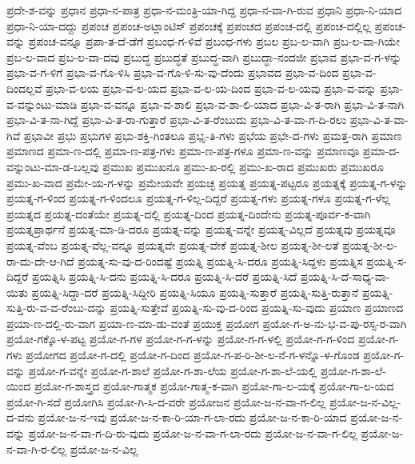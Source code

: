 {ಪ್ರದೇ-ಶ-ವನ್ನು
ಪ್ರಧಾನ
ಪ್ರಧಾ-ನ-ಪಾತ್ರ
ಪ್ರಧಾ-ನ-ಮಂತ್ರಿ-ಯಾ-ಗಿದ್ದ
ಪ್ರಧಾ-ನ-ವಾ-ಗಿ-ರುವ
ಪ್ರಧಾನಿ
ಪ್ರಧಾ-ನಿ-ಯಾದ
ಪ್ರಧಾ-ನಿ-ಯಾ-ದದ್ದು
ಪ್ರಪಂಚ
ಪ್ರಪಂಚ-ಅಟ್ಲಾಂಟಿಸ್
ಪ್ರಪಂಚಕ್ಕೆ
ಪ್ರಪಂಚದ
ಪ್ರಪಂಚ-ದಲ್ಲಿ
ಪ್ರಪಂಚ-ದಲ್ಲಿಲ್ಲ
ಪ್ರಪಂಚ-ವನ್ನು
ಪ್ರಪಂಚ-ವನ್ನೂ
ಪ್ರಪಾ-ತ-ದೆ-ಡೆಗೆ
ಪ್ರಬಂಧ-ಗ-ಳಿವೆ
ಪ್ರಬಂಧ-ಗಳು
ಪ್ರಬಲ
ಪ್ರಬ-ಲ-ವಾಗಿ
ಪ್ರಬ-ಲ-ವಾ-ಗಿಯೇ
ಪ್ರಬ-ಲ-ವಾದ
ಪ್ರಬ-ಲ-ವಾ-ದವು
ಪ್ರಬುದ್ಧ
ಪ್ರಬುದ್ಧತೆ
ಪ್ರಬುದ್ಧ-ವಾಗಿ
ಪ್ರಬುದ್ಧಾ-ನಂದಜೀ
ಪ್ರಭಾವ
ಪ್ರಭಾ-ವ-ಗ-ಳನ್ನು
ಪ್ರಭಾ-ವ-ಗ-ಳಿಗೆ
ಪ್ರಭಾ-ವ-ಗೊ-ಳಿಸಿ
ಪ್ರಭಾ-ವ-ಗೊ-ಳಿ-ಸು-ವು-ದೆಂದು
ಪ್ರಭಾವದ
ಪ್ರಭಾ-ವ-ದಿಂದ
ಪ್ರಭಾ-ವ-ದಿಂದಲ್ಲವೆ
ಪ್ರಭಾ-ವ-ಲಯ
ಪ್ರಭಾ-ವ-ಲ-ಯದ
ಪ್ರಭಾ-ವ-ಲ-ಯ-ದಿಂದ
ಪ್ರಭಾ-ವ-ಲ-ಯವು
ಪ್ರಭಾ-ವ-ವನ್ನು
ಪ್ರಭಾ-ವ-ವನ್ನುಂಟು-ಮಾಡಿ
ಪ್ರಭಾ-ವ-ವನ್ನೂ
ಪ್ರಭಾ-ವ-ಶಾಲಿ
ಪ್ರಭಾ-ವ-ಶಾ-ಲಿ-ಯಾದ
ಪ್ರಭಾ-ವಿ-ತ-ರಾಗಿ
ಪ್ರಭಾ-ವಿ-ತ-ನಾಗಿ
ಪ್ರಭಾ-ವಿ-ತ-ನಾ-ಗಿದ್ದೆ
ಪ್ರಭಾ-ವಿ-ತ-ರಾ-ಗುತ್ತಾರೆ
ಪ್ರಭಾ-ವಿ-ತ-ರೆಂಬುದು
ಪ್ರಭಾ-ವಿ-ತ-ವಾ-ಗ-ದಿ-ರಲು
ಪ್ರಭಾ-ವಿ-ತ-ವಾ-ಗಿವೆ
ಪ್ರಭಾವೀ
ಪ್ರಭು
ಪ್ರಭುಗಳ
ಪ್ರಭು-ಶಕ್ತಿ-ಗಿಂತಲೂ
ಪ್ರಭೃ-ತಿ-ಗಳು
ಪ್ರಭೆಯ
ಪ್ರಭೇ-ದ-ಗಳು
ಪ್ರಮತ್ತ-ರಾಗಿ
ಪ್ರಮಾಣ
ಪ್ರಮಾಣದ
ಪ್ರಮಾ-ಣ-ದಲ್ಲಿ
ಪ್ರಮಾ-ಣ-ಪತ್ರ-ಗಳು
ಪ್ರಮಾ-ಣ-ಪತ್ರ-ಗಳೂ
ಪ್ರಮಾ-ಣ-ವನ್ನು
ಪ್ರಮಾಣವೂ
ಪ್ರಮಾ-ದ-ವನ್ನುಂಟು-ಮಾ-ಡ-ಬಲ್ಲವು
ಪ್ರಮುಖ
ಪ್ರಮುಖನೂ
ಪ್ರಮು-ಖ-ರಲ್ಲಿ
ಪ್ರಮು-ಖ-ರಾದ
ಪ್ರಮುಖರು
ಪ್ರಮುಖರೂ
ಪ್ರಮು-ಖ-ವಾದ
ಪ್ರಮೇ-ಯ-ಗ-ಳನ್ನು
ಪ್ರಮೇಯವೇ
ಪ್ರಯಚ್ಛ
ಪ್ರಯತ್ನ
ಪ್ರಯತ್ನ-ಪಟ್ಟರೂ
ಪ್ರಯತ್ನಕ್ಕೆ
ಪ್ರಯತ್ನ-ಗ-ಳನ್ನು
ಪ್ರಯತ್ನ-ಗ-ಳಿಂದ
ಪ್ರಯತ್ನ-ಗ-ಳಿಂದಲೂ
ಪ್ರಯತ್ನ-ಗ-ಳಿಲ್ಲ-ದಿದ್ದರೆ
ಪ್ರಯತ್ನ-ಗಳು
ಪ್ರಯತ್ನ-ಗಳೂ
ಪ್ರಯತ್ನ-ಗ-ಳೆಲ್ಲ
ಪ್ರಯತ್ನದ
ಪ್ರಯತ್ನ-ದಂತೆಯೇ
ಪ್ರಯತ್ನ-ದಲ್ಲಿ
ಪ್ರಯತ್ನ-ದಿಂದ
ಪ್ರಯತ್ನ-ದಿಂದೇನು
ಪ್ರಯತ್ನ-ಪೂರ್ವ-ಕ-ವಾಗಿ
ಪ್ರಯತ್ನಪ್ರಾರ್ಥನೆ
ಪ್ರಯತ್ನ-ಮಾ-ಡಿ-ದರೂ
ಪ್ರಯತ್ನ-ವನ್ನು
ಪ್ರಯತ್ನ-ವನ್ನೇ
ಪ್ರಯತ್ನ-ವಿಲ್ಲದೆ
ಪ್ರಯತ್ನವು
ಪ್ರಯತ್ನವೂ
ಪ್ರಯತ್ನ-ವೆಂಬ
ಪ್ರಯತ್ನ-ವೆಲ್ಲ-ವನ್ನೂ
ಪ್ರಯತ್ನವೇ
ಪ್ರಯತ್ನ-ವೇಕೆ
ಪ್ರಯತ್ನ-ಶೀಲ
ಪ್ರಯತ್ನ-ಶೀ-ಲತೆ
ಪ್ರಯತ್ನ-ಶೀ-ಲ-ರಾ-ದು-ದೇ-ಆ-ಗಿದೆ
ಪ್ರಯತ್ನ-ಸು-ವು-ದ-ರಿಂದಷ್ಟೆ
ಪ್ರಯತ್ನಿ
ಪ್ರಯತ್ನಿ-ಸಿ-ದರೂ
ಪ್ರಯತ್ನಿ-ಸಿದ್ದಳು
ಪ್ರಯತ್ನಿಸ
ಪ್ರಯತ್ನಿ-ಸ-ದಿದ್ದರೆ
ಪ್ರಯತ್ನಿಸಿ
ಪ್ರಯತ್ನಿ-ಸಿ-ದನು
ಪ್ರಯತ್ನಿ-ಸಿ-ದರೂ
ಪ್ರಯತ್ನಿ-ಸಿ-ದರೆ
ಪ್ರಯತ್ನಿ-ಸಿದೆ
ಪ್ರಯತ್ನಿ-ಸಿ-ದೆ-ಸಾಧ್ಯ-ವಾ-ಯಿತು
ಪ್ರಯತ್ನಿ-ಸಿದ್ದಾ-ದರೆ
ಪ್ರಯತ್ನಿ-ಸಿದ್ದೀರಿ
ಪ್ರಯತ್ನಿ-ಸಿಯೂ
ಪ್ರಯತ್ನಿ-ಸುತ್ತಾರೆ
ಪ್ರಯತ್ನಿ-ಸುತ್ತಿ-ರುತ್ತಾನೆ
ಪ್ರಯತ್ನಿ-ಸುತ್ತಿ-ರು-ವ-ವ-ರೆಂಬು-ದನ್ನು
ಪ್ರಯತ್ನಿ-ಸುತ್ತೇವೆ
ಪ್ರಯತ್ನಿ-ಸು-ವು-ದ-ರಿಂದ
ಪ್ರಯತ್ನಿ-ಸು-ವುದು
ಪ್ರಯಾಣ
ಪ್ರಯಾಣದ
ಪ್ರಯಾ-ಣ-ದಲ್ಲಿ-ರು-ವಾಗ
ಪ್ರಯಾ-ಣ-ಮಾ-ಡು-ವಂತೆ
ಪ್ರಯುಕ್ತ
ಪ್ರಯೋಗ
ಪ್ರಯೋ-ಗ-ಅ-ನು-ಭ-ವ-ಪು-ರಸ್ಸ-ರ-ವಾಗಿ
ಪ್ರಯೋ-ಗಕ್ಕೊ-ಳ-ಪಟ್ಟ
ಪ್ರಯೋ-ಗ-ಗಳ
ಪ್ರಯೋ-ಗ-ಗ-ಳನ್ನು
ಪ್ರಯೋ-ಗ-ಗ-ಳಲ್ಲಿ
ಪ್ರಯೋ-ಗ-ಗ-ಳಿಂದ
ಪ್ರಯೋ-ಗ-ಗಳು
ಪ್ರಯೋಗದ
ಪ್ರಯೋ-ಗ-ದಲ್ಲಿ
ಪ್ರಯೋ-ಗ-ದಿಂದ
ಪ್ರಯೋ-ಗ-ಪ-ರಿ-ಶೀ-ಲ-ನೆ-ಗ-ಳನ್ನೊ-ಳ-ಗೊಂಡ
ಪ್ರಯೋ-ಗ-ವನ್ನು
ಪ್ರಯೋ-ಗ-ವನ್ನೇ
ಪ್ರಯೋ-ಗ-ಶಾಲೆ
ಪ್ರಯೋ-ಗ-ಶಾ-ಲೆಯ
ಪ್ರಯೋ-ಗ-ಶಾ-ಲೆ-ಯಲ್ಲಿ
ಪ್ರಯೋ-ಗ-ಶಾ-ಲೆ-ಯಿಂದ
ಪ್ರಯೋ-ಗ-ಶಾಸ್ತ್ರದ
ಪ್ರಯೋ-ಗಾತ್ಮಕ
ಪ್ರಯೋ-ಗಾತ್ಮ-ಕ-ವಾಗಿ
ಪ್ರಯೋ-ಗಾ-ಲ-ಯಕ್ಕೆ
ಪ್ರಯೋ-ಗಾ-ಲ-ಯದ
ಪ್ರಯೋ-ಗಿ-ಸದೆ
ಪ್ರಯೋಗಿಸಿ
ಪ್ರಯೋ-ಗಿ-ಸಿ-ದ-ವರೇ
ಪ್ರಯೋಜನ
ಪ್ರಯೋ-ಜ-ನ-ವಾ-ಗ-ಲಿಲ್ಲ
ಪ್ರಯೋ-ಜ-ನ-ವಿಲ್ಲ-ದ-ವನು
ಪ್ರಯೋ-ಜ-ನ-ಇವು
ಪ್ರಯೋ-ಜ-ನ-ಕಾ-ರಿ-ಯಾ-ಗ-ಲಾ-ರದು
ಪ್ರಯೋ-ಜ-ನ-ಕಾ-ರಿ-ಯಾದ
ಪ್ರಯೋ-ಜ-ನ-ವನ್ನು
ಪ್ರಯೋ-ಜ-ನ-ವಾ-ಗ-ದಿ-ರು-ವುದು
ಪ್ರಯೋ-ಜ-ನ-ವಾ-ಗ-ಲಾ-ರದು
ಪ್ರಯೋ-ಜ-ನ-ವಾ-ಗ-ಲಿಲ್ಲ
ಪ್ರಯೋ-ಜ-ನ-ವಾ-ಗಿ-ರ-ಲಿಲ್ಲ
ಪ್ರಯೋ-ಜ-ನ-ವಿಲ್ಲ
}
